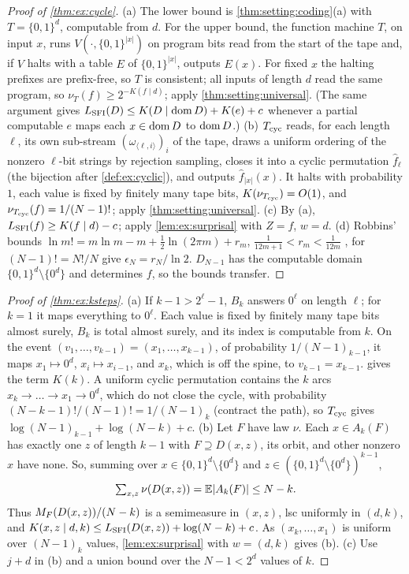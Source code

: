 \begin{proof}[Proof of \cref{thm:ex:cycle}]
(a) The lower bound is \cref{thm:setting:coding}(a) with $T=\{0,1\}^d$, computable from $d$. For the upper bound, the function machine $T$, on input $x$, runs $V(\cdot,\{0,1\}^{|x|})$ on program bits read from the start of the tape and, if $V$ halts with a table $E$ of $\{0,1\}^{|x|}$, outputs $E(x)$. For fixed $x$ the halting prefixes are prefix-free, so $T$ is consistent; all inputs of length $d$ read the same program, so $\nu_T(f)\ge2^{-K(f\mid d)}$; apply \cref{thm:setting:universal}. (The same argument gives $L_{\mathrm{SFI}}(D)\le K(D\mid\operatorname{dom} D)+K(e)+c$ whenever a partial computable $e$ maps each $x\in\operatorname{dom} D$ to $\operatorname{dom} D$.)
(b) $T_{\rm cyc}$ reads, for each length $\ell$, its own sub-stream $(\omega_{\langle\ell,i\rangle})_i$ of the tape, draws a uniform ordering of the nonzero $\ell$-bit strings by rejection sampling, closes it into a cyclic permutation $\hat f_\ell$ (the bijection after \cref{def:ex:cyclic}), and outputs $\hat f_{|x|}(x)$. It halts with probability $1$, each value is fixed by finitely many tape bits, $K(\nu_{T_{\rm cyc}})=O(1)$, and $\nu_{T_{\rm cyc}}(f)=1/(N-1)!$; apply \cref{thm:setting:universal}.
(c) By (a), $L_{\mathrm{SFI}}(f)\ge K(f\mid d)-c$; apply \cref{lem:ex:surprisal} with $Z=f$, $w=d$.
(d) Robbins' bounds $\ln m!=m\ln m-m+\frac12\ln(2\pi m)+r_m$, $\frac1{12m+1}<r_m<\frac1{12m}$ \citep{robbins1955remark}, for $(N-1)!=N!/N$ give $\epsilon_N=r_N/\ln2$.
$D_{N-1}$ has the computable domain $\{0,1\}^d\setminus\{0^d\}$ and determines $f$, so the bounds transfer.
\end{proof}

\begin{proof}[Proof of \cref{thm:ex:ksteps}]
(a) If $k-1>2^\ell-1$, $B_k$ answers $0^\ell$ on length $\ell$; for $k=1$ it maps everything to $0^\ell$. Each value is fixed by finitely many tape bits almost surely, $B_k$ is total almost surely, and its index is computable from $k$. On the event $(v_1,\dots,v_{k-1})=(x_1,\dots,x_{k-1})$, of probability $1/(N-1)_{k-1}$, it maps $x_1\mapsto0^d$, $x_i\mapsto x_{i-1}$, and $x_k$, which is off the spine, to $v_{k-1}=x_{k-1}$.  gives the term $K(k)$. A uniform cyclic permutation contains the $k$ arcs $x_k\to\dots\to x_1\to0^d$, which do not close the cycle, with probability $(N-k-1)!/(N-1)!=1/(N-1)_k$ (contract the path), so $T_{\rm cyc}$ gives $\log(N-1)_{k-1}+\log(N-k)+c$.
(b) Let $F$ have law $\nu$. Each $x\in A_k(F)$ has exactly one $z$ of length $k-1$ with $F\supseteq D(x,z)$, its orbit, and other nonzero $x$ have none. So, summing over $x\in\{0,1\}^d\setminus\{0^d\}$ and $z\in(\{0,1\}^d\setminus\{0^d\})^{k-1}$,
\begin{equation}\label{eq:ex:depth}
\textstyle\sum_{x,z}\nu(D(x,z))=\mathbb{E}|A_k(F)|\le N-k .
\end{equation}
Thus $M_{F}(D(x,z))/(N-k)$ is a semimeasure in $(x,z)$, lsc uniformly in $(d,k)$, and $K(x,z\mid d,k)\le L_{\mathrm{SFI}}(D(x,z))+\log(N-k)+c$. As $(x_k,\dots,x_1)$ is uniform over $(N-1)_k$ values, \cref{lem:ex:surprisal} with $w=(d,k)$ gives (b).
(c) Use $j+d$ in (b) and a union bound over the $N-1<2^d$ values of $k$.
\end{proof}

